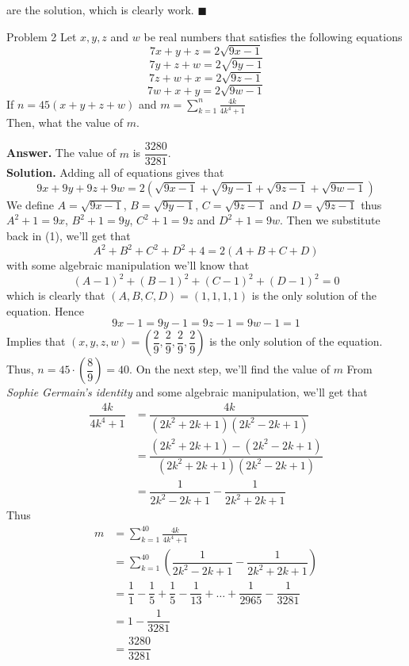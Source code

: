\documentclass[12pt]{article}
\begin{document}
are the solution, which is clearly work. \null\hfill $\blacksquare$
\newpage
\begin{mybox}{Problem 2}
Let $x,y,z$ and $w$ be real numbers that satisfies the following equations $$7x+y+z = 2\sqrt{9x-1}$$ $$7y+z+w = 2\sqrt{9y-1}$$ $$7z+w+x = 2\sqrt{9z-1}$$ $$7w+x+y = 2\sqrt{9w-1}$$ If $n = 45(x+y+z+w)$ and $m =\displaystyle \sum^{n}_{k=1} \frac{4k}{4k^{4}+1}$ \\ Then, what  the value of $m$.
\end{mybox}
\textbf{Answer.} The value of $m$ is $\dfrac{3280}{3281}$.\\
\textbf{Solution.} Adding all of equations gives that
\begin{equation}9x+9y+9z+9w=2(\sqrt{9x-1}+\sqrt{9y-1}+\sqrt{9z-1}+\sqrt{9w-1}) \end{equation}
We define $A=\sqrt{9x-1}$, $B=\sqrt{9y-1}$, $C=\sqrt{9z-1}$ and  $D=\sqrt{9z-1}$ thus \\
$A^2+1=9x$, $B^2+1=9y$, $C^2+1=9z$ and $D^2+1=9w$. Then we substitute back in (1), we'll get that
$$A^2+B^2+C^2+D^2+4=2(A+B+C+D)$$ 
with some algebraic manipulation we'll know that
$$(A-1)^2+(B-1)^2+(C-1)^2+(D-1)^2 = 0$$
which is clearly that $(A,B,C,D)=(1,1,1,1)$ is the only solution of the equation.
Hence $$9x-1=9y-1=9z-1=9w-1=1$$ Implies that $(x,y,z,w)=\left(\dfrac{2}{9},\dfrac{2}{9},\dfrac{2}{9},\dfrac{2}{9}\right)$ is the only solution of the equation.\\
Thus, $n=45 \cdot \left(\dfrac{8}{9}\right)=40$. On the next step, we'll find the value of $m$ 
\newpage
From \emph{Sophie Germain's identity} and some algebraic manipulation, we'll get that 
\begin{align*}
\dfrac{4k}{4k^4+1} &=\dfrac{4k}{(2k^2+2k+1)(2k^2-2k+1)} \\
&= \dfrac{(2k^2+2k+1)-(2k^2-2k+1)}{(2k^2+2k+1)(2k^2-2k+1)} \\
&= \dfrac{1}{2k^2-2k+1} - \dfrac{1}{2k^2+2k+1}
\end{align*}
Thus
\begin{align*}
m &=\displaystyle \sum^{40}_{k=1} \frac{4k}{4k^4+1}\\
&= \displaystyle \sum^{40}_{k=1} \left(\dfrac{1}{2k^2-2k+1} - \dfrac{1}{2k^2+2k+1}\right)\\
&= \dfrac{1}{1} - \dfrac{1}{5} +\dfrac{1}{5} -\dfrac{1}{13} + \dots + \dfrac{1}{2965} - \dfrac{1}{3281}\\
&= 1 - \dfrac{1}{3281}\\
&= \dfrac{3280}{3281}
\end{align*}
\end{document}
